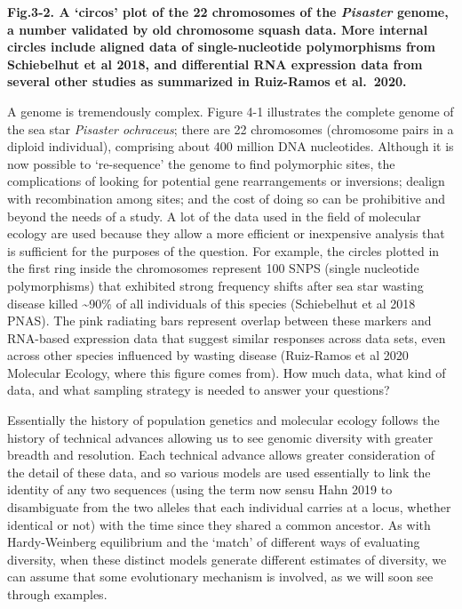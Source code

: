 \documentclass[
]{article}
\begin{document}
\textbf{Fig.3-2. A `circos' plot of the 22 chromosomes of the
\emph{Pisaster} genome, a number validated by old chromosome squash
data. More internal circles include aligned data of single-nucleotide
polymorphisms from Schiebelhut et al 2018, and differential RNA
expression data from several other studies as summarized in Ruiz-Ramos
et al.~2020.}

A genome is tremendously complex. Figure 4-1 illustrates the complete
genome of the sea star \emph{Pisaster ochraceus}; there are 22
chromosomes (chromosome pairs in a diploid individual), comprising about
400 million DNA nucleotides. Although it is now possible to
`re-sequence' the genome to find polymorphic sites, the complications of
looking for potential gene rearrangements or inversions; dealign with
recombination among sites; and the cost of doing so can be prohibitive
and beyond the needs of a study. A lot of the data used in the field of
molecular ecology are used because they allow a more efficient or
inexpensive analysis that is sufficient for the purposes of the
question. For example, the circles plotted in the first ring inside the
chromosomes represent 100 SNPS (single nucleotide polymorphisms) that
exhibited strong frequency shifts after sea star wasting disease killed
\textasciitilde90\% of all individuals of this species (Schiebelhut et
al 2018 PNAS). The pink radiating bars represent overlap between these
markers and RNA-based expression data that suggest similar responses
across data sets, even across other species influenced by wasting
disease (Ruiz-Ramos et al 2020 Molecular Ecology, where this figure
comes from). How much data, what kind of data, and what sampling
strategy is needed to answer your questions?

Essentially the history of population genetics and molecular ecology
follows the history of technical advances allowing us to see genomic
diversity with greater breadth and resolution. Each technical advance
allows greater consideration of the detail of these data, and so various
models are used essentially to link the identity of any two sequences
(using the term now sensu Hahn 2019 to disambiguate from the two alleles
that each individual carries at a locus, whether identical or not) with
the time since they shared a common ancestor. As with Hardy-Weinberg
equilibrium and the `match' of different ways of evaluating diversity,
when these distinct models generate different estimates of diversity, we
can assume that some evolutionary mechanism is involved, as we will soon
see through examples.
\end{document}
